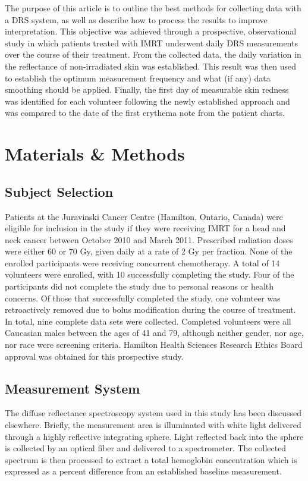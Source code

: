 The purpose of this article is to outline the best methods for collecting data with a DRS system, as well as describe how to process the results to improve interpretation. This objective was achieved through a prospective, observational study in which patients treated with IMRT underwent daily DRS measurements over the course of their treatment. From the collected data, the daily variation in the reflectance of non-irradiated skin was established. This result was then used to establish the optimum measurement frequency and what (if any) data smoothing should be applied. Finally, the first day of measurable skin redness was identified for each volunteer following the newly established approach and was compared to the date of the first erythema note from the patient charts.

\section{Materials \& Methods}

\subsection{Subject Selection}
Patients at the Juravinski Cancer Centre (Hamilton, Ontario, Canada) were eligible for inclusion in the study if they were receiving IMRT for a head and neck cancer between October 2010 and March 2011. Prescribed radiation doses were either 60 or 70 Gy, given daily at a rate of 2 Gy per fraction. None of the enrolled participants were receiving concurrent chemotherapy. A total of 14 volunteers were enrolled, with 10 successfully completing the study. Four of the participants did not complete the study due to personal reasons or health concerns. Of those that successfully completed the study, one volunteer was retroactively removed due to bolus modification during the course of treatment. In total, nine complete data sets were collected. Completed volunteers were all Caucasian males between the ages of 41 and 79, although neither gender, nor age, nor race were screening criteria. Hamilton Health Sciences Research Ethics Board approval was obtained for this prospective study.

\subsection{Measurement System}
The diffuse reflectance spectroscopy system used in this study has been discussed elsewhere.\cite{Glennie2014a} Briefly, the measurement area is illuminated with white light delivered through a highly reflective integrating sphere. Light reflected back into the sphere is collected by an optical fiber and delivered to a spectrometer. The collected spectrum is then processed to extract a total hemoglobin concentration\cite{Glennie2014b} which is expressed as a percent difference from an established baseline measurement.

